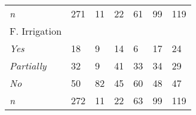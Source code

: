 \documentclass[
  12pt,
  a4paper]{article}
\begin{document}
\begin{table}[ht!]
\begin{tabular}{@{}lllllll@{}}
\hspace{3mm}\textit{n}                        & 271    & 11    & 22        & 61      & 99        & 119   \\
F. Irrigation                     &        &       &           &         &           &       \\
\hspace{3mm}\textit{Yes}                      & 18     & 9     & 14        & 6       & 17        & 24    \\
\hspace{3mm}\textit{Partially}                & 32     & 9     & 41        & 33      & 34        & 29    \\
\hspace{3mm}\textit{No}                       & 50     & 82    & 45        & 60      & 48        & 47    \\
\hspace{3mm}\textit{n}                        & 272    & 11    & 22        & 63      & 99        & 119   \\ \bottomrule
\end{tabular}
\end{table}

\newpage
\end{document}
